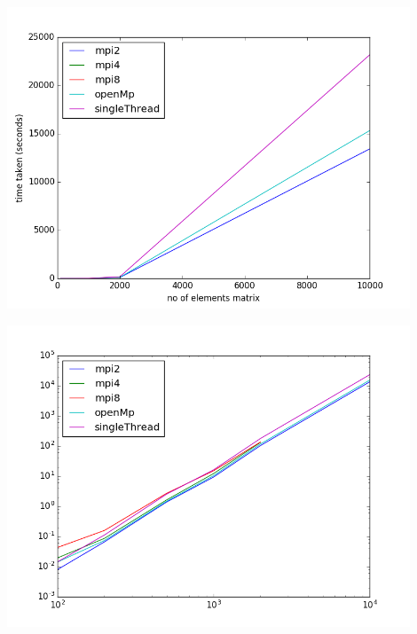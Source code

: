 \documentclass[12pt]{article}
\begin{document}
\includegraphics[width=12cm]{normal}

\includegraphics[width=12cm]{log}
\end{document}
